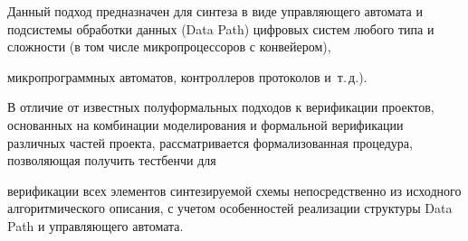\begin{center}\small\nwt


\parbox{150mm}{ Данный подход  предназначен для синтеза в виде управляющего автомата и подсистемы обработки данных (Data Path) цифровых систем любого типа и сложности (в том числе микропроцессоров с конвейером), 


микропрограммных автоматов, контроллеров протоколов и~т.\,д.).


В отличие от известных полуформальных подходов к верификации проектов, основанных на комбинации моделирования и формальной верификации различных частей проекта, рассматривается формализованная процедура, позволяющая получить тестбенчи для 


верификации всех элементов синтезируемой схемы непосредственно из исходного алгоритмического описания, с учетом особенностей реализации структуры  Data Path и управляющего автомата.}


\end{center}










\label{end\stat}





\renewcommand{\figurename}{\protect\bf Рис.}


\renewcommand{\tablename}{\protect\bf Таблица}


\renewcommand{\bibname}{\protect\rmfamily Литература}


